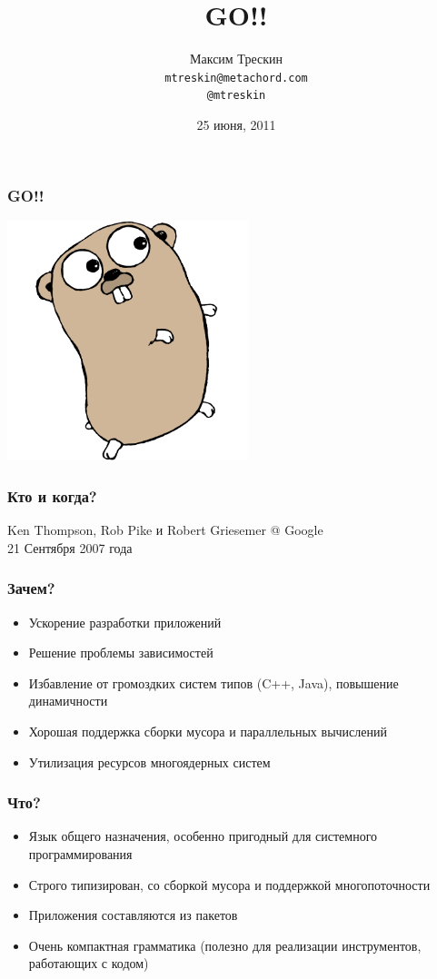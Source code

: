\documentclass{beamer}
\title{GO!!}
\author{Максим Трескин\\ \texttt{mtreskin@metachord.com} \\ \texttt{@mtreskin}}
\date[2011.06.25]{25 июня, 2011}
\begin{document}
\begin{frame}
  \titlepage
\end{frame}


\begin{frame}
  \frametitle{GO!!}
  \begin{minipage}[t]{90px}
    \hfil
    \includegraphics[height=7cm]{gopher_c.png}
    \hfil
  \end{minipage}
\end{frame}

\begin{frame}
  \frametitle{Кто и когда?}
  Ken Thompson, Rob Pike и Robert Griesemer @ Google\\
  21 Сентября 2007 года
\end{frame}

\begin{frame}
  \frametitle{Зачем?}
  \begin{itemize}
  \item Ускорение разработки приложений
  \item Решение проблемы зависимостей
  \item Избавление от громоздких систем типов (C++, Java), повышение динамичности
  \item Хорошая поддержка сборки мусора и параллельных вычислений
  \item Утилизация ресурсов многоядерных систем
  \end{itemize}
\end{frame}


\begin{frame}
  \frametitle{Что?}
  \begin{itemize}
  \item Язык общего назначения, особенно пригодный для системного программирования
  \item Строго типизирован, со сборкой мусора и поддержкой многопоточности
  \item Приложения составляются из пакетов
  \item Очень компактная грамматика (полезно для реализации инструментов, работающих с кодом)
  \end{itemize}
\end{frame}
\end{document}
